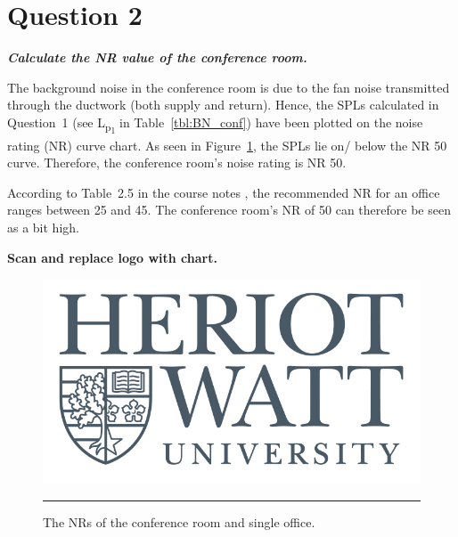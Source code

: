 \section{Question 2} \label{sec:Q2}

\textit{\textbf{Calculate the NR value of the conference room.}}

The background noise in the conference room is due to the fan noise transmitted through the ductwork (both supply and return).
Hence, the SPLs calculated in Question~1 (see L\textsubscript{p\textsubscript{1}} in Table~\ref{tbl:BN_conf}) have been plotted on the noise rating (NR) curve chart.
As seen in Figure~\ref{fig:NR_chart}, the SPLs lie on/ below the NR 50 curve.
Therefore, the conference room's noise rating is NR 50.

According to Table~2.5 in the course notes \citep{unit2}, the recommended NR for an office ranges between 25 and 45.
The conference room's NR of 50 can therefore be seen as a bit high.

\textbf{Scan and replace logo with chart.}

\begin{figure}[htbp]
	\centering
	\includegraphics[width=\textwidth]{figures/HWlogo2016.jpg}
	\rule{\textwidth}{0.5pt} %
	\caption{The NRs of the conference room and single office.}
	\label{fig:NR_chart}
\end{figure}